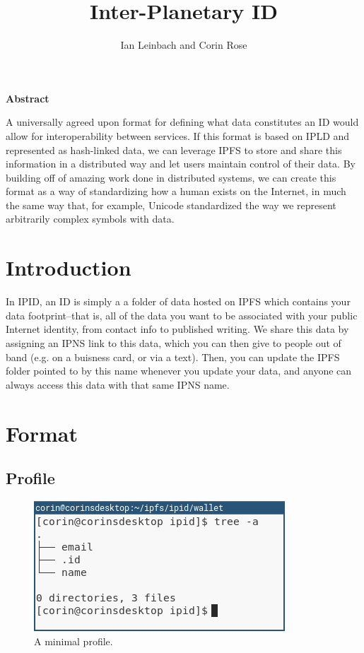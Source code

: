\documentclass{article}
\author{Ian Leinbach and Corin Rose}
\title{Inter-Planetary ID}
\begin{document}
\maketitle

\begin{center}
\textbf{Abstract} 
\end{center}

A universally agreed upon format for defining what data constitutes an ID would allow for interoperability between services. If this format is based on IPLD and represented as hash-linked data, we can leverage IPFS to store and share this information in a distributed way and let users maintain control of their data. By building off of amazing work done in distributed systems, we can create this format as a way of standardizing how a human exists on the Internet, in much the same way that, for example, Unicode standardized the way we represent arbitrarily complex symbols with data.  

\section{Introduction}
In IPID, an ID is simply a a folder of data hosted on IPFS which contains your data footprint--that is, all of the data you want to be associated with your public Internet identity, from contact info to published writing. We share this data by assigning an IPNS link to this data, which you can then give to people out of band (e.g. on a buisness card, or via a text). Then, you can update the IPFS folder pointed to by this name whenever you update your data, and anyone can always access this data with that same IPNS name. 

\section{Format}

\subsection{Profile}

\begin{figure}[h]
  \centering
  \includegraphics[width=.5\textwidth]{resources/basic_profile.png}
  \caption{A minimal profile.}
\end{figure}
\end{document}
